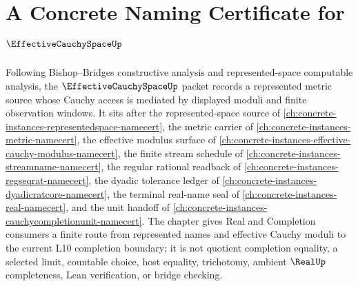 \chapter{A Concrete Naming Certificate for $\EffectiveCauchySpaceUp$}
\label{ch:concrete-instances-effective-cauchy-space-namecert}

Following Bishop--Bridges constructive analysis and represented-space computable analysis, the $\EffectiveCauchySpaceUp$ packet records a represented metric source whose Cauchy access is mediated by displayed moduli and finite observation windows. It sits after the represented-space source of \autoref{ch:concrete-instances-representedspace-namecert}, the metric carrier of \autoref{ch:concrete-instances-metric-namecert}, the effective modulus surface of \autoref{ch:concrete-instances-effective-cauchy-modulus-namecert}, the finite stream schedule of \autoref{ch:concrete-instances-streamname-namecert}, the regular rational readback of \autoref{ch:concrete-instances-regseqrat-namecert}, the dyadic tolerance ledger of \autoref{ch:concrete-instances-dyadicratcore-namecert}, the terminal real-name seal of \autoref{ch:concrete-instances-real-namecert}, and the unit handoff of \autoref{ch:concrete-instances-cauchycompletionunit-namecert}. The chapter gives Real and Completion consumers a finite route from represented names and effective Cauchy moduli to the current L10 completion boundary; it is not quotient completion equality, a selected limit, countable choice, host equality, trichotomy, ambient $\RealUp$ completeness, Lean verification, or bridge checking.

